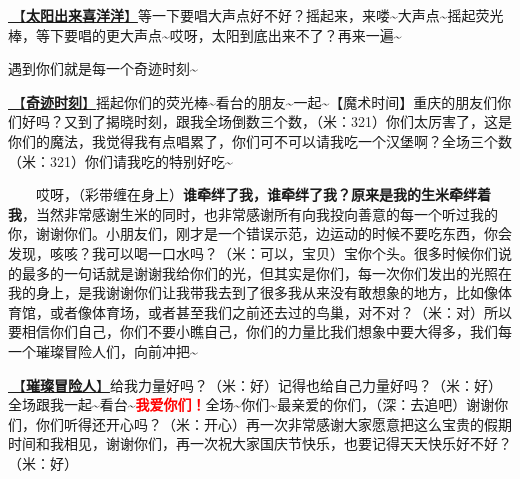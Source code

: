 \documentclass[]{ctexbook}
\begin{document}
\hyperref[happy-sun]{🎵【\textbf{太阳出来喜洋洋}】}等一下要唱大声点好不好？摇起来，来喽\textasciitilde 大声点\textasciitilde 摇起荧光棒，等下要唱的更大声点\textasciitilde 哎呀，太阳到底出来不了？再来一遍\textasciitilde{}

遇到你们就是每一个奇迹时刻\textasciitilde{}

\hyperref[magic-moment]{🎵【\textbf{奇迹时刻}】}摇起你们的荧光棒\textasciitilde 看台的朋友\textasciitilde 一起\textasciitilde【魔术时间】重庆的朋友们你们好吗？又到了揭晓时刻，跟我全场倒数三个数，（米：321）你们太厉害了，这是你们的魔法，我觉得我有点唱累了，你们可不可以请我吃一个汉堡啊？全场三个数（米：321）你们请我吃的特别好吃\textasciitilde{}

  哎呀，（彩带缠在身上）\textbf{谁牵绊了我，谁牵绊了我？原来是我的生米牵绊着我}，当然非常感谢生米的同时，也非常感谢所有向我投向善意的每一个听过我的你，谢谢你们。小朋友们，刚才是一个错误示范，边运动的时候不要吃东西，你会发现，咳咳？我可以喝一口水吗？（米：可以，宝贝）宝你个头。很多时候你们说的最多的一句话就是谢谢我给你们的光，但其实是你们，每一次你们发出的光照在我的身上，是我谢谢你们让我带我去到了很多我从来没有敢想象的地方，比如像体育馆，或者像体育场，或者甚至我们之前还去过的鸟巢，对不对？（米：对）所以要相信你们自己，你们不要小瞧自己，你们的力量比我们想象中要大得多，我们每一个璀璨冒险人们，向前冲把\textasciitilde{}

\hyperref[adventurers]{🎵【\textbf{璀璨冒险人}】}给我力量好吗？（米：好）记得也给自己力量好吗？（米：好）全场跟我一起\textasciitilde 看台\textasciitilde{}\textbf{\textcolor{red}{我爱你们！}}全场\textasciitilde 你们\textasciitilde 最亲爱的你们，（深：去追吧）谢谢你们，你们听得还开心吗？（米：开心）再一次非常感谢大家愿意把这么宝贵的假期时间和我相见，谢谢你们，再一次祝大家国庆节快乐，也要记得天天快乐好不好？（米：好）
\end{document}
